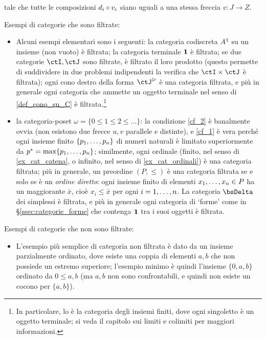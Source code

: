 tale che tutte le composizioni \(d_i\circ v_i\) siano uguali a una stessa freccia \(v : J\to Z\).
\begin{examples}\label{contro_esempi_filt}
	Esempi di categorie che sono filtrate:
	\begin{itemize}
		\item Alcuni esempi elementari sono i seguenti: la categoria codiscreta \(A^\chi\) su un insieme (non vuoto) è filtrata; la categoria terminale \(\mathbf{1}\) è filtrata; se due categorie \(\ctI,\ctJ\) sono filtrate, è filtrato il loro prodotto (questo permette di suddividere in due problemi indipendenti la verifica che \(\ctI\times\ctJ\) è filtrata); ogni cono destro della forma \(\ctJ^\rhd\) è una categoria filtrata, e più in generale ogni categoria che ammette un oggetto terminale nel senso di \ref{def_cono_su_C} è filtrata.\footnote{In particolare, lo è la categoria degli insiemi finiti, dove ogni singoletto è un oggetto terminale; si veda il capitolo sui limiti e colimiti per maggiori informazioni.}
		\item la categoria-poset \(\omega=\{0\le 1\le 2\le\dots\}\): la condizione \ref{cf_2} è banalmente ovvia (non esistono due frecce \(u,v\) parallele e distinte), e \ref{cf_1} è vera perché ogni insieme finito \(\{\tup pn,\}\) di numeri naturali è limitato superiormente da \(p^*=\max\{\tup pn,\}\); similmente, ogni ordinale (finito, nel senso di \ref{ex_cat_catena}, o infinito, nel senso di \ref{ex_cat_ordinali}) è una categoria filtrata; più in generale, un preordine \((P,\le)\) è una categoria filtrata se e solo se è un \emph{ordine diretto}: ogni insieme finito di elementi \(\tup xn, \in P\) ha un maggiorante \(\bar x\), cioè \(x_i\le \bar x\) per ogni \(i=\iter n\). La categoria \(\bsDelta\) dei simplessi è filtrata, e più in generale ogni categoria di `forme' come in §\ref{ssec:categorie_forme} che contenga \(\mathbf{1}\) tra i suoi oggetti è filtrata.
	\end{itemize}
	Esempi di categorie che non sono filtrate:
	\begin{itemize}
		\item L'esempio più semplice di categoria non filtrata è dato da un insieme parzialmente ordinato, dove esiste una coppia di elementi \(a,b\) che non possiede un estremo superiore; l'esempio minimo è quindi l'insieme \(\{0,a,b\}\) ordinato da \(0\le a,b\) (ma \(a,b\) non sono confrontabili, e quindi non esiste un cocono per \(\{a,b\}\)).

\end{itemize}
\end{examples}
